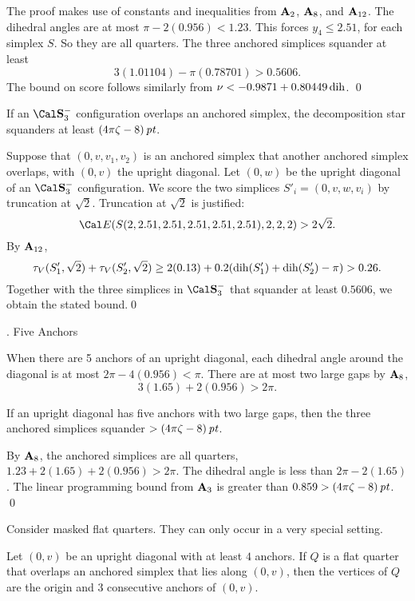   The proof makes use of constants 
and inequalities from ${\bold A}_2$, ${\bold A}_8$,
and ${\bold A}_{12}$.  The dihedral angles are at most
$\pi- 2(0.956) < 1.23$.
This forces $y_4\le 2.51$, for each simplex $S$.
  So they are all quarters.
The
three anchored simplices squander at least
$$3 (1.01104) - \pi (0.78701) > 0.5606.
$$
The bound on score follows similarly from $\nu<-0.9871+0.80449\operatorname{dih}$.
\qed\enddemo


  If an $\Sminus$ configuration
overlaps an anchored simplex,
the decomposition star squanders at least $(4\pi\zeta-8)\,\hbox{\it pt}$.
\endproclaim

Suppose that $(0,v,v_1,v_2)$ is an anchored
simplex that another anchored simplex overlaps, with $(0,v)$ the
upright diagonal.  Let $(0,w)$ be the upright diagonal of an
$\Sminus$ configuration.
We score the two simplices $S'_i = (0,v,w,v_i)$ by truncation at
$\sqrt{2}$.  Truncation at $\sqrt{2}$ 
is justified:
	$$\Cal E(S(2,2.51,2.51,2.51,2.51,2.51),2,2,2)>2\sqrt{2}.$$
By ${\bold A}_{12}$,
	$$\tau_V(S'_1,\sqrt{2})+\tau_V(S'_2,\sqrt{2})\ge 2(0.13) +
		0.2(\operatorname{dih}(S'_1)+\operatorname{dih}(S'_2)-\pi) > 0.26.$$
Together with the three simplices in $\Sminus$
 that squander
at least $0.5606$, we obtain the stated bound.\qed
\enddemo







\subhead {}.  Five Anchors\endsubhead


When there are 5 anchors of an upright diagonal, each dihedral
angle around the diagonal is at most $2\pi-4(0.956)<\pi$.
There are at most two large gaps by ${\bold A}_8$,
$$3(1.65)+2(0.956)>2\pi.$$

  If an upright diagonal has five anchors with
two large gaps, then the three anchored simplices squander
$>(4\pi\zeta-8)\,\hbox{\it pt}$.
\endproclaim

 By ${\bold A}_8$, the anchored simplices are all quarters,
 $1.23+2(1.65)+2(0.956)>2\pi$.  The dihedral angle
is less than $2\pi-2(1.65)$.  The linear programming bound from
${\bold A}_3$ is greater than $0.859>(4\pi\zeta-8)\,\hbox{\it pt}$.
\qed
\enddemo

Consider masked flat quarters.
They can only occur in a very special setting.

 Let $(0,v)$ be an upright diagonal with at least $4$
anchors.  If $Q$ is a flat quarter that overlaps an anchored
simplex that lies along $(0,v)$, 
then the vertices of $Q$ are the origin
and 3 consecutive anchors of $(0,v)$.
\endproclaim

